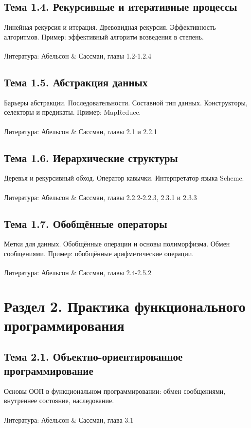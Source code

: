 \documentclass[a4paper,11pt]{article}
\begin{document}
\subsection*{Тема 1.4. Рекурсивные и итеративные процессы}
Линейная рекурсия и итерация. Древовидная рекурсия. Эффективность алгоритмов.
Пример: эффективный алгоритм возведения в степень.
\\\\
Литература: Абельсон \& Сассман, главы 1.2-1.2.4

\subsection*{Тема 1.5. Абстракция данных}
Барьеры абстракции. Последовательности. Составной тип данных. Конструкторы,
селекторы и предикаты. Пример: MapReduce.
\\\\
Литература: Абельсон \& Сассман, главы 2.1 и 2.2.1

\subsection*{Тема 1.6. Иерархические структуры}
Деревья и рекурсивный обход. Оператор кавычки. Интерпретатор языка Scheme.
\\\\
Литература: Абельсон \& Сассман, главы 2.2.2-2.2.3, 2.3.1 и 2.3.3

\subsection*{Тема 1.7. Обобщённые операторы}
Метки для данных. Обобщённые операции и основы полиморфизма. Обмен
сообщениями. Пример: обобщённые арифметические операции.
\\\\
Литература: Абельсон \& Сассман, главы 2.4-2.5.2

\section*{Раздел 2. Практика функционального программирования}

\subsection*{Тема 2.1. Объектно-ориентированное программирование}
Основы ООП в функциональном программировании: обмен сообщениями,
внутреннее состояние, наследование.
\\\\
Литература: Абельсон \& Сассман, глава 3.1
\end{document}
